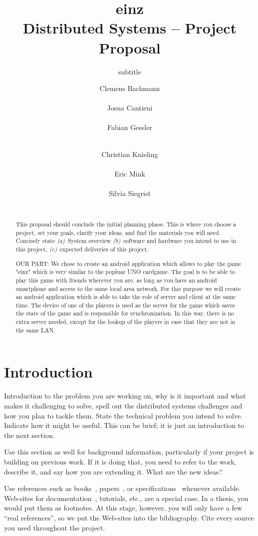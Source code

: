 \documentclass{report}
\title{einz\\
\normalsize{Distributed Systems -- Project Proposal}}
\subtitle{subtitle}
\author{
\alignauthor
\normalsize{Clemens Bachmann}\\
	\affaddr{\normalsize{13-932-488}}\\
	\email{\normalsize{baclemen@student.ethz.ch}}
%
\alignauthor
\normalsize{Josua Cantieni}\\
	\affaddr{\normalsize{15-919-038}}\\
	\email{\normalsize{josuac@student.ethz.ch}}
%
\alignauthor
\normalsize{Fabian Gessler}\\
	\affaddr{\normalsize{15-939-341}}\\
	\email{\normalsize{fgessler@student.ethz.ch}}
\and
\alignauthor
\normalsize{Christian Knieling}\\
	\affaddr{\normalsize{ 14-923-809}}\\
	\email{\normalsize{knielinc@student.ethz.ch}}
%
\alignauthor
\normalsize{Eric Mink}\\
	\affaddr{\normalsize{15-917-057}}\\
	\email{\normalsize{minker@student.ethz.ch}}
%
\alignauthor
\normalsize{Silvia Siegrist}\\
	\affaddr{\normalsize{15-935-893}}\\
	\email{\normalsize{sisilvia@student.ethz.ch}}
}
\begin{document}
\maketitle

\begin{abstract}
This proposal should conclude the initial planning phase. This is where you choose a project, set your goals,
clarify your ideas, and find the materials you will need. 
Concisely state 
\textit{(a)}~System overview
\textit{(b)}~software and hardware you intend to use in this project,
\textit{(c)}~expected deliveries of this project.

OUR PART:
We chose to create an android application which allows to play the game "einz" which is very similar to the popluar UNO cardgame. The goal is to be able to play this game with friends wherever you are, as long as you have an android smartphone and access to the same local area network.
For this purpose we will create an android application which is able to take the role of server and client at the same time. The device of one of the players is used as the server for the game which saves the state of the game and is responsible for synchronization. In this way, there is no extra server needed, except for the lookup of the players in case that they are not in the same LAN.
\end{abstract}

\section{Introduction}

Introduction to the problem you are working on, why is it important and
what makes it challenging to solve, spell out the distributed systems challenges and how you plan to tackle them. 
State the technical problem you intend to solve. Indicate how it might be useful. This can be brief; it is just
an introduction to the next section.

Use this section as well for background information, particularly if your project is building on
previous work. If it is doing that, you need to refer to the work, describe it,
and say how you are extending it. What are the new ideas?

Use references such as books~\cite{hello}, papers~\cite{REST}, or specifications~\cite{RFC2616} whenever available.
Web-sites for documentation~\cite{devServices}, tutorials, etc., are a special case.
In a thesis, you would put them as footnotes.
At this stage, however, you will only have a few ``real references'',
so we put the Web-sites into the bibliography.
Cite every source you used throughout the project.\\
\end{document}
